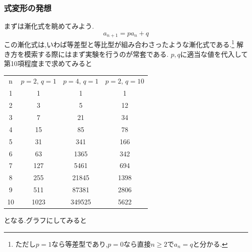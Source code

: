   \subsubsection{式変形の発想}
  まずは漸化式を眺めてみよう.
  \[
   a_{n+1}=pa_n+q
  \]
  この漸化式は,いわば等差型と等比型が組み合わさったような漸化式である.\footnote{ただし$p=1$なら等差型であり,$p=0$なら直接$n\ge2$で$a_n=q$と分かる.}
  解き方を模索する際にはまず実験を行うのが常套である.
  $p,q$に適当な値を代入して第10項程度まで求めてみると
  \begin{center}
    \begin{tabular}{cccc}\Xhline{1.5pt}
      n&	$p=2,\,q=1$&	$p=4,\,q=1$&	$p=2,\,q=10$\\
      1&	1&	1&	1\\
      2&	3&	5&	12\\
      3&	7&	21&	34\\
      4&	15&	85&	78\\
      5&	31&	341&	166\\
      6&	63&	1365&	342\\
      7&	127&	5461&	694\\
      8&	255&	21845&	1398\\
      9&	511&	87381&	2806\\
      10&	1023&	349525&	5622\\
    \end{tabular}
  \end{center}
  となる.グラフにしてみると
  \par\smallskip\noindent
